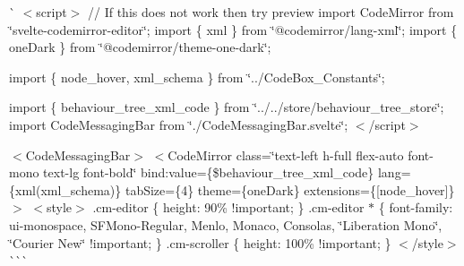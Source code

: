 \`{} $<$script$>$ // If this does not work then try preview import Code\+Mirror from \char`\"{}svelte-\/codemirror-\/editor\char`\"{}; import \{ xml \} from \char`\"{}@codemirror/lang-\/xml\char`\"{}; import \{ one\+Dark \} from \char`\"{}@codemirror/theme-\/one-\/dark\char`\"{};

import \{ node\+\_\+hover, xml\+\_\+schema \} from \char`\"{}../\+Code\+Box\+\_\+\+Constants\char`\"{};

import \{ behaviour\+\_\+tree\+\_\+xml\+\_\+code \} from \char`\"{}../../store/behaviour\+\_\+tree\+\_\+store\char`\"{}; import Code\+Messaging\+Bar from \char`\"{}./\+Code\+Messaging\+Bar.\+svelte\char`\"{}; $<$/script$>$

 $<$\+Code\+Messaging\+Bar$>$ $<$\+Code\+Mirror         class=\char`\"{}text-\/left h-\/full flex-\/auto font-\/mono text-\/lg font-\/bold\char`\"{}         bind\+:value=\{\$behaviour\+\_\+tree\+\_\+xml\+\_\+code\}         lang=\{xml(xml\+\_\+schema)\}         tab\+Size=\{4\}         theme=\{one\+Dark\}         extensions=\{\mbox{[}node\+\_\+hover\mbox{]}\}     $>$ $<$style$>$ .cm-\/editor \{ height\+: 90\% !important; \} .cm-\/editor $\ast$ \{ font-\/family\+: ui-\/monospace, SFMono-\/\+Regular, Menlo, Monaco, Consolas, \char`\"{}\+Liberation Mono\char`\"{}, \char`\"{}\+Courier New\char`\"{} !important; \} .cm-\/scroller \{ height\+: 100\% !important; \} $<$/style$>$  \`{}\`{}\`{} 